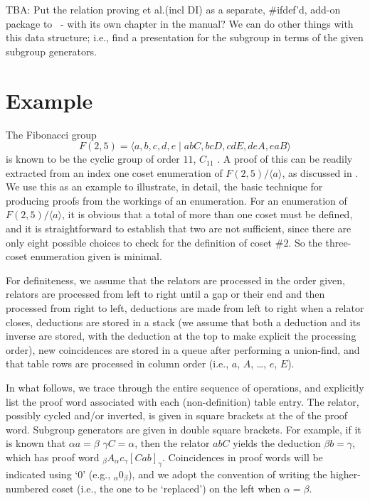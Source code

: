 
%
%

TBA:
Put the relation proving et al.\@ (incl DI) as a separate, \#ifdef'd,
  add-on package to \ace\ - with its own chapter in the manual?
We can do other things with this data structure; i.e., find a presentation
  for the subgroup in terms of the given subgroup generators.

\section{Example}

The Fibonacci group 
 $$ F(2,5) = \langle a,b,c,d,e \mid abC, bcD, cdE, deA, eaB \rangle $$
  is known to be the cyclic group of order $11$, $C_{11}$ \cite{Can}.
A proof of this can be readily extracted from an index one coset 
  enumeration of $F(2,5) / \langle a \rangle$, as discussed in \cite{Lee2}.
We use this as an example to illustrate, in detail, the basic technique for
  producing proofs from the workings of an enumeration.
%
For an enumeration of $F(2,5) / \langle a \rangle$, it is obvious that a
  total of more than one coset must be defined, and it is straightforward
  to establish that two are not sufficient, since there are only eight
  possible choices to check for the definition of coset \#$2$.
So the three-coset enumeration given is minimal.

For definiteness, we assume that the relators are processed in the order
  given, relators are processed from left to right until a gap or their
  end and then processed from right to left, deductions are made from left
  to right when a relator closes, deductions are stored in a stack (we 
  assume that both a deduction and its inverse are stored, with the 
  deduction at the top to make explicit the processing order), new
  coincidences are stored in a queue after performing a union-find, and
  that table rows are processed in column order (i.e., 
  $a$, $A$, \dots, $e$, $E$).

In what follows, we trace through the entire sequence of operations, and
  explicitly list the proof word associated with each (non-definition)
  table entry.
The relator, possibly cycled and/or inverted, is given in square brackets
  at the  of the proof word.
Subgroup generators are given in double square brackets.
For example, if it is known that $\alpha a = \beta$ \amp 
  $\gamma C = \alpha$, then the relator $abC$ yields the deduction 
  $\beta b = \gamma$, which has proof word 
  $_{\beta}A_{\alpha}c_{\gamma}[Cab]_{\gamma}$.
Coincidences in proof words will be indicated using `$0$' (e.g., 
  $_\alpha 0_\beta$), and we adopt the convention of writing the 
  higher-numbered coset (i.e., the one to be `replaced') on the left when
  $\alpha = \beta$.

